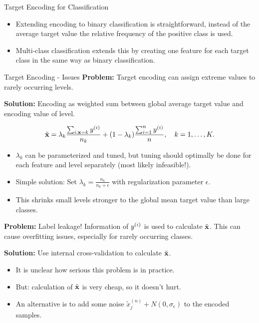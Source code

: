 \begin{vbframe}{Target Encoding for Classification}
  \begin{itemize}
    \item Extending encoding to binary classification is straightforward, instead of the average target value the relative frequency of the positive class is used.
    \item Multi-class classification extends this by creating one feature for each target class in the same way as binary classification.
  \end{itemize}
\end{vbframe}

\begin{vbframe}{Target Encoding - Issues}
  \textbf{Problem:} Target encoding can assign extreme values to rarely occurring levels.
  
  \vspace*{0.2cm}
  
  \textbf{Solution:} Encoding as weighted sum between global average target value and encoding value of level.
  
  $$
    \tilde {\mathbf{x}} = \lambda_k\frac{\sum_{i:\mathbf{x}=k}y^{(i)}}{n_k} + (1-\lambda_k)\frac{\sum_{i=1}^n  y^{(i)}} {n}, \quad k=1,\dots,K.
  $$
  
  \begin{itemize}
    \item $\lambda_k$ can be parameterized and tuned, but tuning should optimally be done for each feature and level separately (most likely infeasible!).
    \item Simple solution: Set $\lambda_k=\frac{n_k}{n_k+\epsilon}$ with regularization parameter $\epsilon$.
    \item This shrinks small levels stronger to the global mean target value than large classes.
  \end{itemize}
  \framebreak
  
  
  \textbf{Problem:} Label leakage! Information of $y^{(i)}$ is used to calculate $\tilde {\mathbf{x}}$. This can cause overfitting issues, especially for rarely occurring classes.
  
  \vspace*{0.2cm}
  
  \textbf{Solution:} Use internal cross-validation to calculate $\tilde {\mathbf{x}}$.
  \vspace{+.4cm}
  
  \begin{itemize}
    \item It is unclear how serious this problem is in practice.
    \item But: calculation of $\tilde {\mathbf{x}}$ is very cheap, so it doesn't hurt.
    \item An alternative is to add some noise $\tilde x_j^{(n)} + N(0,\sigma_\epsilon)$ to the encoded samples.
  \end{itemize}
\end{vbframe}

\endlecture

